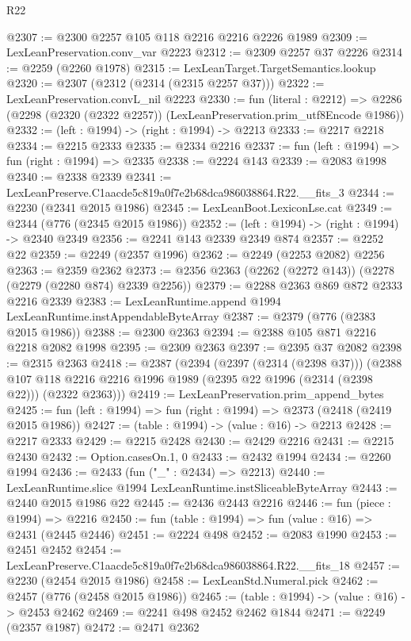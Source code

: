 \begin{lexlean}{R22}
\begin{coremodule}
@2307 := @2300 @2257 @105 @118 @2216 @2216 @2226 @1989
@2309 := LexLeanPreservation.conv_var @2223
@2312 := @2309 @2257 @37 @2226
@2314 := @2259 (@2260 @1978)
@2315 := LexLeanTarget.TargetSemantics.lookup
@2320 := @2307 (@2312 (@2314 (@2315 @2257 @37)))
@2322 := LexLeanPreservation.convL_nil @2223
@2330 := fun (literal : @2212) =>
  @2286 (@2298 (@2320 (@2322 @2257)) (LexLeanPreservation.prim_utf8Encode @1986))
@2332 := (left : @1994) -> (right : @1994) -> @2213
@2333 := @2217 @2218
@2334 := @2215 @2333
@2335 := @2334 @2216
@2337 := fun (left : @1994) => fun (right : @1994) => @2335
@2338 := @2224 @143
@2339 := @2083 @1998
@2340 := @2338 @2339
@2341 := LexLeanPreserve.C1aacde5c819a0f7e2b68dca986038864.R22.__fits_3
@2344 := @2230 (@2341 @2015 @1986)
@2345 := LexLeanBoot.LexiconLse.cat
@2349 := @2344 (@776 (@2345 @2015 @1986))
@2352 := (left : @1994) -> (right : @1994) -> @2340 @2349
@2356 := @2241 @143 @2339 @2349 @874
@2357 := @2252 @22
@2359 := @2249 (@2357 @1996)
@2362 := @2249 (@2253 @2082) @2256
@2363 := @2359 @2362
@2373 := @2356 @2363 (@2262 (@2272 @143)) (@2278 (@2279 (@2280 @874) @2339 @2256))
@2379 := @2288 @2363 @869 @872 @2333 @2216 @2339
@2383 := LexLeanRuntime.append @1994 LexLeanRuntime.instAppendableByteArray
@2387 := @2379 (@776 (@2383 @2015 @1986))
@2388 := @2300 @2363
@2394 := @2388 @105 @871 @2216 @2218 @2082 @1998
@2395 := @2309 @2363
@2397 := @2395 @37 @2082
@2398 := @2315 @2363
@2418 := @2387
    (@2394
      (@2397 (@2314 (@2398 @37)))
      (@2388 @107 @118 @2216 @2216 @1996 @1989 (@2395 @22 @1996 (@2314 (@2398 @22))) (@2322 @2363)))
@2419 := LexLeanPreservation.prim_append_bytes
@2425 := fun (left : @1994) => fun (right : @1994) => @2373 (@2418 (@2419 @2015 @1986))
@2427 := (table : @1994) -> (value : @16) -> @2213
@2428 := @2217 @2333
@2429 := @2215 @2428
@2430 := @2429 @2216
@2431 := @2215 @2430
@2432 := Option.casesOn.{1, 0}
@2433 := @2432 @1994
@2434 := @2260 @1994
@2436 := @2433 (fun ("_" : @2434) => @2213)
@2440 := LexLeanRuntime.slice @1994 LexLeanRuntime.instSliceableByteArray
@2443 := @2440 @2015 @1986 @22
@2445 := @2436 @2443 @2216
@2446 := fun (piece : @1994) => @2216
@2450 := fun (table : @1994) => fun (value : @16) => @2431 (@2445 @2446)
@2451 := @2224 @498
@2452 := @2083 @1990
@2453 := @2451 @2452
@2454 := LexLeanPreserve.C1aacde5c819a0f7e2b68dca986038864.R22.__fits_18
@2457 := @2230 (@2454 @2015 @1986)
@2458 := LexLeanStd.Numeral.pick
@2462 := @2457 (@776 (@2458 @2015 @1986))
@2465 := (table : @1994) -> (value : @16) -> @2453 @2462
@2469 := @2241 @498 @2452 @2462 @1844
@2471 := @2249 (@2357 @1987)
@2472 := @2471 @2362

\end{coremodule}
\end{lexlean}
